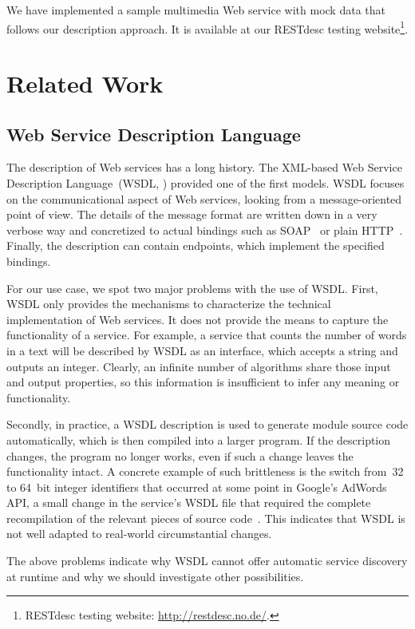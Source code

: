 \documentclass[runningheads,a4paper, twocolumn]{llncs}
\begin{document}
We have implemented a sample multimedia Web service with mock data that follows our description approach. It is available at our RESTdesc testing website\footnote{\label{RESTdescWebsite}RESTdesc testing website: \url{http://restdesc.no.de/}.}.

\section{Related Work} \label{sec:related-work}
\subsection{Web Service Description Language}
\label{subsec:WSDL}
The description of Web services has a long history. The XML-based Web Service Description Language~(WSDL, \cite{WSDL1, WSDL2}) provided one of the first models. WSDL focuses on the communicational aspect of Web services, looking from a message-oriented point of view. The details of the message format are written down in a very verbose way and concretized to actual bindings such as SOAP~\cite{SOAP} or plain HTTP~\cite{HTTP}. Finally, the description can contain endpoints, which implement the specified bindings.

For our use case, we spot two major problems with the use of WSDL. First, WSDL only provides the mechanisms to characterize the technical implementation of Web services. It does not provide the means to capture the functionality of a service. For example, a service that counts the number of words in a text will be described by WSDL as an interface, which accepts a string and outputs an integer. Clearly, an infinite number of algorithms share those input and output properties, so this information is insufficient to infer any meaning or functionality.

Secondly, in practice, a WSDL description is used to generate module source code automatically, which is then compiled into a larger program. If the description changes, the program no longer works, even if such a change leaves the functionality intact. A concrete example of such brittleness is the switch from~32 to 64~bit integer identifiers that occurred at some point in Google's AdWords API, a small change in the service's WSDL file that required the complete recompilation of the relevant pieces of source code~\cite{WhySOAPSucks}. This indicates that WSDL is not well adapted to real-world circumstantial changes.

The above problems indicate why WSDL cannot offer automatic service discovery at runtime and why we should investigate other possibilities.
\end{document}
